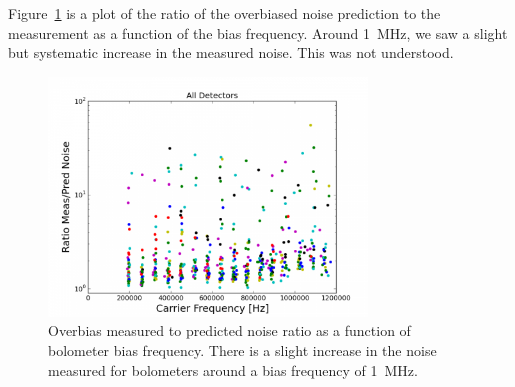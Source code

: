 
Figure~\ref{fig:overbias_noise_vs_freq} is a plot of the ratio of the overbiased noise prediction to the measurement as a function of the bias frequency. 
Around 1~MHz, we saw a slight but systematic increase in the measured noise. 
This was not understood. 

\begin{figure}[htp]
\begin{center}
\includegraphics[height=2.5in]{figures/overbias_noise_vs_freq}
\caption[Measured to predicted overbias noise as a function of bias frequency]{Overbias measured to predicted noise ratio as a function of bolometer bias frequency. There is a slight increase in the noise measured for bolometers around a bias frequency of 1~MHz. 
\label{fig:overbias_noise_vs_freq} }
\end{center}
\end{figure}

%








